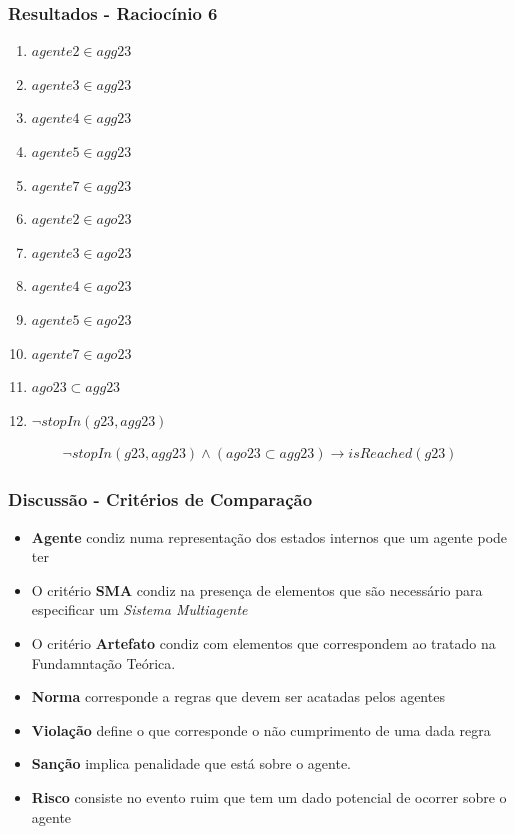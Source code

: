 \documentclass{beamer}
\begin{document}
\begin{frame}
	\frametitle{Resultados - Raciocínio 6}
	\begin{enumerate}
		\item $agente2 \in agg23$	
		\item $agente3 \in agg23$
		\item $agente4 \in agg23$
		\item $agente5 \in agg23$
		\item $agente7 \in agg23$								
		\item $agente2 \in ago23$	
		\item $agente3 \in ago23$
		\item $agente4 \in ago23$
		\item $agente5 \in ago23$
		\item $agente7 \in ago23$	
		\item $ago23 \subset agg23$
		\item $\neg stopIn(g23,agg23)$										
	\end{enumerate}
	\begin{eqnarray}\label{rel15}
		\neg stopIn(g23,agg23) \wedge (ago23 \subset agg23) \to isReached(g23)
	\end{eqnarray}
\end{frame}
\begin{frame}
	\frametitle{Discussão - Critérios de Comparação}
	\begin{itemize}
		\item \textbf{Agente} condiz numa representação dos estados internos que um agente pode ter
		\item O critério \textbf{SMA} condiz na presença de elementos que são necessário para especificar um \textit{Sistema Multiagente}
		\item O critério \textbf{Artefato} condiz com elementos que correspondem ao tratado na Fundamntação Teórica.
		\item \textbf{Norma} corresponde a regras que devem ser acatadas pelos agentes 
		\item \textbf{Violação} define o que corresponde o não cumprimento de uma dada regra
		\item \textbf{Sanção} implica penalidade que está sobre o agente.
		\item \textbf{Risco} consiste no evento ruim que tem um dado potencial de ocorrer sobre o agente
	\end{itemize}
\end{frame}
\end{document}
